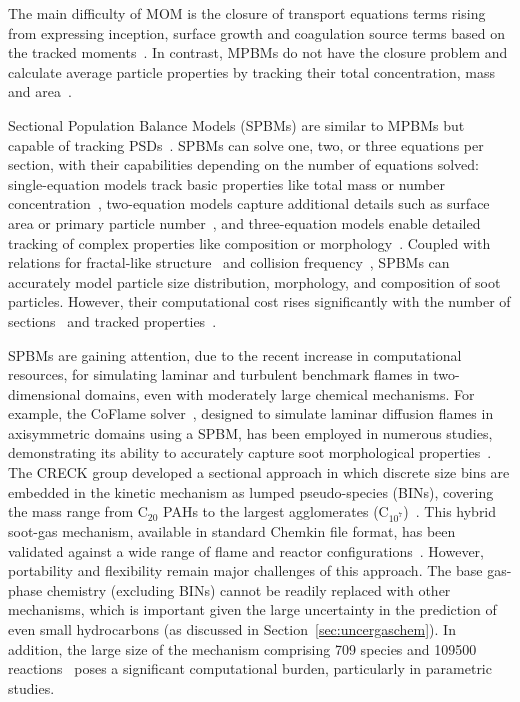 The main difficulty of MOM is the closure of transport equations terms rising from expressing inception, surface growth and coagulation source terms based on the tracked moments~\citep{frenklach2002method}. In contrast, MPBMs do not have the closure problem and calculate average particle properties by tracking their total concentration, mass \citep{kruis1993simple} and area~\citep{tsantilis2004soft, lindstedt1994simplified}. 

Sectional Population Balance Models (SPBMs) are similar to MPBMs but capable of tracking PSDs~\citep{Xiong1993}. SPBMs can solve one, two, or three equations per section, with their capabilities depending on the number of equations solved: single-equation models track basic properties like total mass or number concentration~\citep{gelbard1980sectional}, two-equation models capture additional details such as surface area or primary particle number~\citep{park2004novel}, and three-equation models enable detailed tracking of complex properties like composition or morphology~\citep{kholghy2016core}. Coupled with relations for fractal-like structure~\citep{matsoukas1991dynamics} and collision frequency~\citep{fuchs1964mechanics}, SPBMs can accurately model particle size distribution, morphology, and composition of soot particles. However, their computational cost rises significantly with the number of sections~\citep{xiong1993formation} and tracked properties~\citep{kholghy2016core}.

 
SPBMs are gaining attention, due to the recent increase in computational resources, for simulating laminar and turbulent benchmark flames in two-dimensional domains, even with moderately large chemical mechanisms. For example, the CoFlame solver~\citep{eaves2016coflame}, designed to simulate laminar diffusion flames in axisymmetric domains using a SPBM, has been employed in numerous studies, demonstrating its ability to accurately capture soot morphological properties~\citep{dworkin2011application, liu2015numerical}. The CRECK group developed a sectional approach in which discrete size bins are embedded in the kinetic mechanism as lumped pseudo-species (BINs), covering the mass range from $\mathrm{C_{20}}$ PAHs to the largest agglomerates ($\mathrm{C_{10^7}}$)~\citep{cuoci2015opensmoke++, cuoci2013computational}. This hybrid soot-gas mechanism, available in standard Chemkin file format, has been validated against a wide range of flame and reactor configurations~\cite{ramalli2023automatic}. However, portability and flexibility remain major challenges of this approach. The base gas-phase chemistry (excluding BINs) cannot be readily replaced with other mechanisms, which is important given the large uncertainty in the prediction of even small hydrocarbons (as discussed in Section~\ref{sec:uncergaschem}). In addition, the large size of the mechanism comprising 709 species and 109500 reactions~\citep{nobili2022modeling} poses a significant computational burden, particularly in parametric studies.


